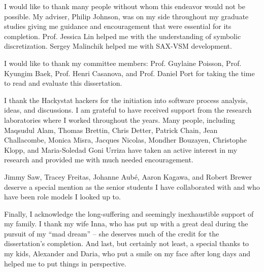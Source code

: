 \begin{acknowledgments}
 
I would like to thank many people without whom this endeavor would not be possible. My adviser, Philip Johnson, was on my side throughout my graduate studies giving me guidance and encouragement that were essential for its completion. Prof. Jessica Lin helped me with the understanding of symbolic discretization. Sergey Malinchik helped me with SAX-VSM development.  

I would like to thank my committee members: Prof. Guylaine Poisson, Prof. Kyungim Baek, Prof. Henri Casanova, and Prof. Daniel Port for taking the time to read and evaluate this dissertation.

I thank the Hackystat hackers for the initiation into software process analysis, ideas, and discussions. I am grateful to have received support from the research laboratories where I worked throughout the years. Many people, including Maqsudul Alam, Thomas Brettin, Chris Detter, Patrick Chain, Jean Challacombe, Monica Misra, Jacques Nicolas, Mondher Bouzayen, Christophe Klopp, and Maria-Soledad Goni Urriza have taken an active interest in my research and provided me with much needed encouragement.

Jimmy Saw, Tracey Freitas, Johanne Aub\'{e}, Aaron Kagawa, and Robert Brewer deserve a special mention as the senior students I have collaborated with and who have been role models I looked up to.

Finally, I acknowledge the long-suffering and seemingly inexhaustible support of my family. I thank my wife Inna, who has put up with a great deal during the pursuit of my ``mad dream'' -- she deserves much of the credit for the dissertation's completion. And last, but certainly not least, a special thanks to my kids, Alexander and Daria, who put a smile on my face after long days and helped me to put things in perspective.

\end{acknowledgments}